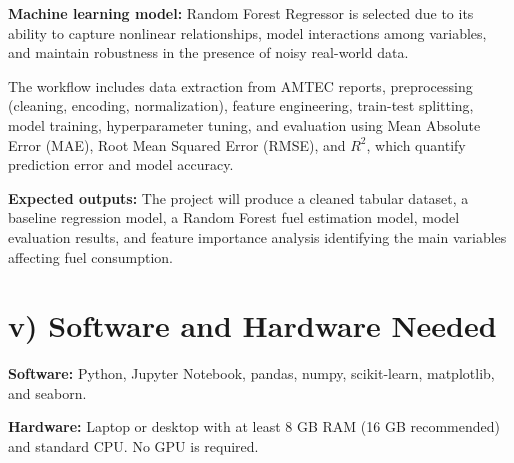\documentclass[11pt,twocolumn]{article}
\begin{document}
\textbf{Machine learning model:} Random Forest Regressor is selected due to its ability to capture nonlinear relationships, model interactions among variables, and maintain robustness in the presence of noisy real-world data.

\vspace{10pt}

The workflow includes data extraction from AMTEC reports, preprocessing (cleaning, encoding, normalization), feature engineering, train-test splitting, model training, hyperparameter tuning, and evaluation using Mean Absolute Error (MAE), Root Mean Squared Error (RMSE), and $R^2$, which quantify prediction error and model accuracy.

\vspace{10pt}

\textbf{Expected outputs:} The project will produce a cleaned tabular dataset, a baseline regression model, a Random Forest fuel estimation model, model evaluation results, and feature importance analysis identifying the main variables affecting fuel consumption.

\section*{\small v) Software and Hardware Needed}

\textbf{Software:} Python, Jupyter Notebook, pandas, numpy, scikit-learn, matplotlib, and seaborn.

\vspace{10pt}

\textbf{Hardware:} Laptop or desktop with at least 8 GB RAM (16 GB recommended) and standard CPU. No GPU is required.
\end{document}
